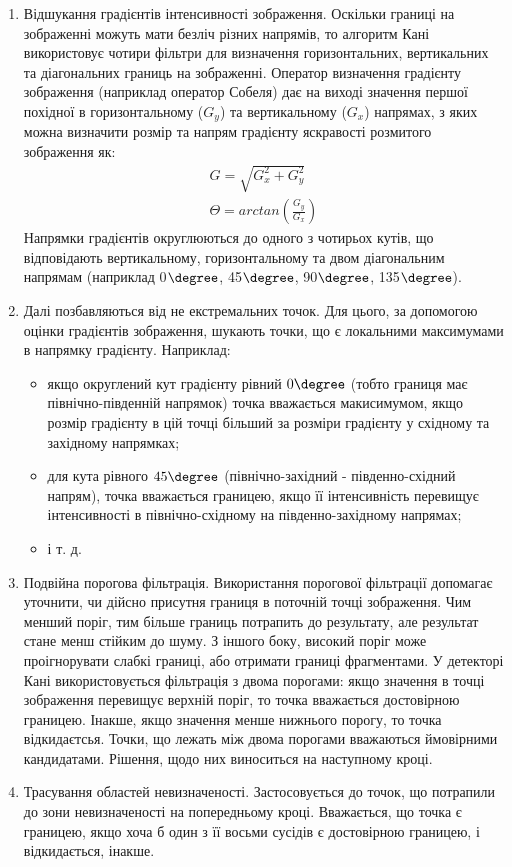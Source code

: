 \begin{enumerate}
  \item Відшукання градієнтів інтенсивності зображення. Оскільки границі на зображенні можуть мати безліч різних напрямів, то алгоритм Кані використовує чотири фільтри для визначення горизонтальних, вертикальних та діагональних границь на зображенні. Оператор визначення градієнту зображення (наприклад оператор Собеля) дає на виході значення першої похідної в горизонтальному ($G_y$) та вертикальному ($G_x$) напрямах, з яких можна визначити розмір та напрям градієнту яскравості розмитого зображення як:
    \begin{align}
      G = \sqrt{G_x^2 + G_y^2} \\
      \Theta = arctan(\frac{G_y}{G_x})
    \end{align}
    Напрямки градієнтів округлюються до одного з чотирьох кутів, що відповідають вертикальному, горизонтальному та двом діагональним напрямам (наприклад 0$\degree$, 45$\degree$, 90$\degree$, 135$\degree$).
  \item Далі позбавляються від не екстремальних точок. Для цього, за допомогою оцінки градієнтів зображення, шукають точки, що є локальними максимумами в напрямку градієнту. Наприклад:
    \begin{itemize}
      \item якщо округлений кут градієнту рівний $0\degree$ (тобто границя має північно-південній напрямок) точка вважається макисимумом, якщо розмір градієнту в цій точці більший за розміри градієнту у східному та західному напрямках;
      \item для кута рівного $45\degree$ (північно-західний - південно-східний напрям), точка вважається границею, якщо її інтенсивність перевищує інтенсивності в північно-східному на південно-західному напрямах;
      \item і т. д.
    \end{itemize}
  \item Подвійна порогова фільтрація. Використання порогової фільтрації допомагає уточнити, чи дійсно присутня границя в поточній точці зображення. Чим менший поріг, тим більше границь потрапить до результату, але результат стане менш стійким до шуму. З іншого боку, високий поріг може проігнорувати слабкі границі, або отримати границі фрагментами. У детекторі Кані використовується фільтрація з двома порогами: якщо значення в точці зображення перевищує верхній поріг, то точка вважається достовірною границею. Інакше, якщо значення менше нижнього порогу, то точка відкидаєтсья. Точки, що лежать між двома порогами вважаються ймовірними кандидатами. Рішення, щодо них виноситься на наступному кроці.
  \item Трасування областей невизначеності. Застосовується до точок, що потрапили до зони невизначеності на попередньому кроці. Вважається, що точка є границею, якщо хоча б один з її восьми сусідів є достовірною границею, і відкидається, інакше. 
\end{enumerate}

